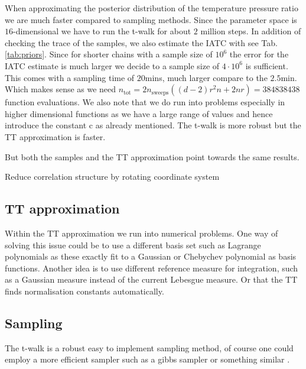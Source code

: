 When approximating the posterior distribution of the temperature pressure ratio we are much faster compared to sampling methods.
Since the parameter space is $16$-dimensional we have to run the t-walk for about $2$ million steps.
In addition of checking the trace of the samples, we also estimate the IATC with \cite{UwerrM} see Tab. \ref{tab:priors}.
Since for shorter chains with a sample size of $10^6$ the error for the IATC estimate is much larger we decide to a sample size of $4 \cdot 10^6$ is sufficient.
This comes with a sampling time of $20$mins, much larger compare to the $2.5$min.
Which makes sense as we need $n_{\text{tot}} = 2n_{\text{sweeps}}((d-2)r^2n+ 2nr) = 384838438$ function evaluations.
We also note that we do run into problems especially in higher dimensional functions as we have a large range of values and hence introduce the constant c as already mentioned.
The t-walk is more robust but the TT approximation is faster.

But both the samples and the TT approximation point towards the same results.

Reduce correlation structure by rotating coordinate system
\subsection{TT approximation}
Within the TT approximation we run into numerical problems.
One way of solving this issue could be to use a different basis set such as Lagrange polynomials as these exactly fit to a Gaussian or Chebychev polynomial as basis functions.
Another idea is to use different reference measure for integration, such as a Gaussian measure instead of the current Lebesgue measure.
Or that the TT finds normalisation constants automatically.

\subsection{Sampling}
The t-walk is a robust easy to implement sampling method, of course one could employ a more efficient sampler such as a gibbs sampler or something similar \cite{}.

